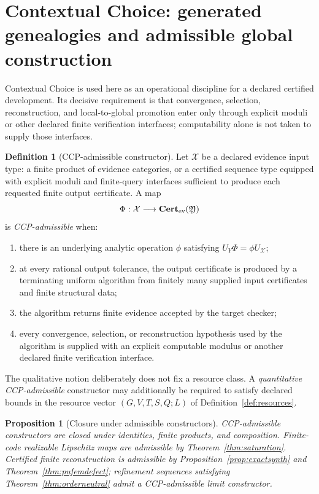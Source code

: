 \documentclass[11pt]{article}
\newtheorem{proposition}[theorem]{Proposition}
\theoremstyle{definition}
\newtheorem{definition}[theorem]{Definition}
\newcommand{\Cert}{\mathbf{Cert}}
\begin{document}
\section{Contextual Choice: generated genealogies and admissible global construction}\label{sec:ccp}

Contextual Choice is used here as an operational discipline for a declared certified
development.  Its decisive requirement is that convergence, selection, reconstruction,
and local-to-global promotion enter only through explicit moduli or other declared finite
verification interfaces; computability alone is not taken to supply those interfaces.

\begin{definition}[CCP-admissible constructor]\label{def:ccpadm}
Let $\mathcal X$ be a declared evidence input type: a finite product of evidence
categories, or a certified sequence type equipped with explicit moduli and finite-query
interfaces sufficient to produce each requested finite output certificate.  A map
\[
 \Phi:\mathcal X\longrightarrow\Cert_{\rm ev}(\mathfrak Y)
\]
is \emph{CCP-admissible} when:
\begin{enumerate}[label=(\roman*)]
\item there is an underlying analytic operation $\phi$ satisfying
$U_Y\Phi=\phi U_{\mathcal X}$;
\item at every rational output tolerance, the output certificate is produced by a
terminating uniform algorithm from finitely many supplied input certificates and finite
structural data;
\item the algorithm returns finite evidence accepted by the target checker;
\item every convergence, selection, or reconstruction hypothesis used by the algorithm is
supplied with an explicit computable modulus or another declared finite verification
interface.
\end{enumerate}
\end{definition}

The qualitative notion deliberately does not fix a resource class.  A \emph{quantitative
CCP-admissible} constructor may additionally be required to satisfy declared bounds in the
resource vector $(G,V,T,S,Q;L)$ of Definition~\ref{def:resources}.

\begin{proposition}[Closure under admissible constructors]\label{prop:ccpclosure}
CCP-admissible constructors are closed under identities, finite products, and composition.
Finite-code realizable Lipschitz maps are admissible by Theorem~\ref{thm:saturation}.
Certified finite reconstruction is admissible by Proposition~\ref{prop:exactsynth} and
Theorem~\ref{thm:pufemdefect}; refinement sequences satisfying
Theorem~\ref{thm:orderneutral} admit a CCP-admissible limit constructor.
\end{proposition}
\end{document}

